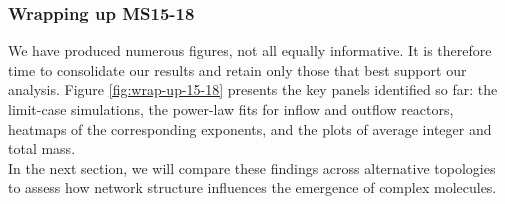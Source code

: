 \documentclass[11pt]{article}
\begin{document}
\clearpage

\subsubsection{Wrapping up MS15-18}
\label{subsubsec:wrap-up-15-18}

We have produced numerous figures, not all equally informative. It is therefore time to consolidate our results and retain only those that best support our analysis. Figure \ref{fig:wrap-up-15-18} presents the key panels identified so far: the limit-case simulations, the power-law fits for inflow and outflow reactors, heatmaps of the corresponding exponents, and the plots of average integer and total mass.\\

In the next section, we will compare these findings across alternative topologies to assess how network structure influences the emergence of complex molecules.\\

\clearpage

\end{document}
